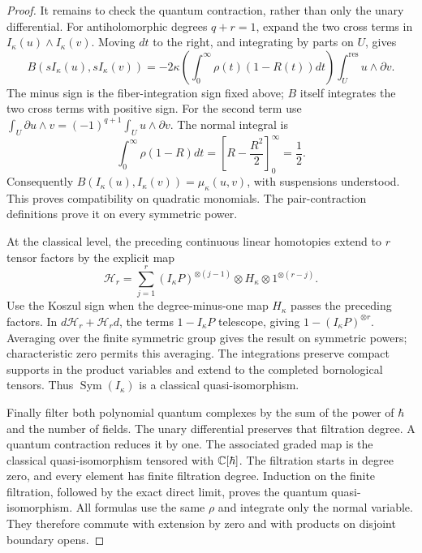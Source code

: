 \begin{proof}
It remains to check the quantum contraction, rather than only the
unary differential.  For antiholomorphic degrees $q+r=1$, expand the
two cross terms in $I_\kappa(u)\wedge I_\kappa(v)$.
Moving $dt$ to the right, and integrating by parts on $U$, gives
\[
 B(sI_\kappa(u),sI_\kappa(v))
 =-2\kappa\left(\int_0^\infty\rho(t)(1-R(t))dt\right)
                          \int_U^{\mathrm{res}}u\wedge\partial v.
\]
The minus sign is the fiber-integration sign fixed above;
$B$ itself integrates the two cross terms with positive sign.
For the second term use
$\int_U\partial u\wedge v=(-1)^{q+1}\int_Uu\wedge\partial v$.
The normal integral is
\[
 \int_0^\infty\rho(1-R)dt
  =\left[R-\frac{R^2}{2}\right]_0^\infty=\frac12.
\]
Consequently $B(I_\kappa(u),I_\kappa(v))=\mu_\kappa(u,v)$, with
suspensions understood.  This proves compatibility on quadratic
monomials.  The pair-contraction definitions prove it on every
symmetric power.

At the classical level, the preceding continuous linear homotopies
extend to $r$ tensor factors by the explicit map
\[
 \mathscr H_r=\sum_{j=1}^r
 (I_\kappa P)^{\otimes(j-1)}\otimes H_\kappa
                       \otimes1^{\otimes(r-j)}.
\]
Use the Koszul sign when the degree-minus-one map $H_\kappa$ passes
the preceding factors.  In $d\mathscr H_r+\mathscr H_rd$, the terms
$1-I_\kappa P$ telescope, giving $1-(I_\kappa P)^{\otimes r}$.
Averaging
over the finite symmetric group gives the result on symmetric powers;
characteristic zero permits this averaging.  The integrations preserve
compact supports in the product variables and extend to the completed
bornological tensors.  Thus $\operatorname{Sym}(I_\kappa)$ is a
classical quasi-isomorphism.

Finally filter both polynomial quantum complexes by the sum of the
power of $\hbar$ and the number of fields.  The unary differential
preserves that filtration degree.  A quantum contraction reduces it
by one.  The associated graded map is the classical
quasi-isomorphism tensored with $\mathbb C[\hbar]$.  The filtration starts
in degree zero, and every element has finite filtration degree.
Induction on the finite filtration, followed by the exact direct
limit, proves the quantum quasi-isomorphism.
All formulas use the same $\rho$ and integrate only the normal
variable.  They therefore commute with extension by zero and with
products on disjoint boundary opens.
\end{proof}


